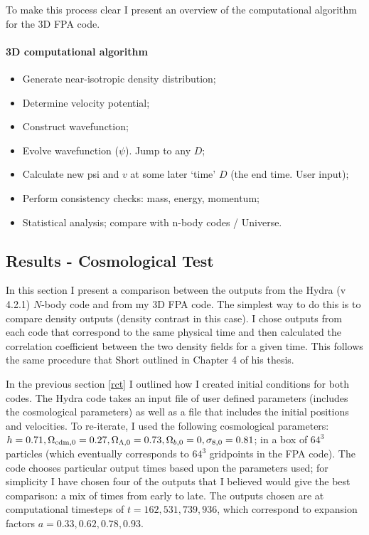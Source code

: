 To make this process clear I present an overview of the computational algorithm for the 3D FPA code.

\paragraph{3D computational algorithm}

\begin{itemize}
\item Generate near-isotropic density distribution;
\item Determine velocity potential;
\item Construct wavefunction;
\item Evolve wavefunction ($\psi$). Jump to any $D$;
\item Calculate new psi and $v$ at some later `time' $D$ (the end time. User input);
\item Perform consistency checks: mass, energy, momentum;
\item Statistical analysis; compare with n-body codes / Universe.
\end{itemize}

\subsection{Results - Cosmological Test}
In this section I present a comparison between the outputs from the Hydra (v 4.2.1) $N$-body code and from my 3D FPA code. The simplest way to do this is to compare density outputs (density contrast in this case). I chose outputs from each code that correspond to the same physical time and then calculated the correlation coefficient between the two density fields for a given time. This follows the same procedure that Short outlined in Chapter 4 of his thesis.

In the previous section \ref{rct} I outlined how I created initial conditions for both codes. The Hydra code takes an input file of user defined parameters (includes the cosmological parameters) as well as a file that includes the initial positions and velocities. To re-iterate, I used the following cosmological parameters:  $h= 0.71, \Omega_{\rm cdm,0}=0.27, \Omega_{\Lambda,0}=0.73,\Omega_{b,0} =0, \sigma_{8,0}=0.81$; in a box of $64^3$ particles (which eventually corresponds to $64^3$ gridpoints in the FPA code). The code chooses particular output times based upon the parameters used; for simplicity I have chosen four of the outputs that I believed would give the best comparison: a mix of times from early to late. The outputs chosen are at computational timesteps of $t = 162, 531, 739, 936$, which correspond to expansion factors $a = 0.33, 0.62, 0.78, 0.93$.

